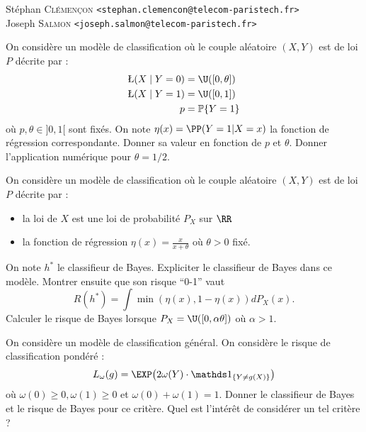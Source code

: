 \documentclass[a4paper,11pt]{article}
\begin{document}
\sloppy
{}

\medskip

\indent St\'ephan \textsc{Clémençon}  \texttt{<stephan.clemencon@telecom-paristech.fr>}
\\
\indent Joseph \textsc{Salmon} \texttt{<joseph.salmon@telecom-paristech.fr>}

\medskip



\exercice On considère un modèle de classification où le couple aléatoire $(X, Y)$ est de loi $P$ décrite par :
\begin{align*}
\L (X \mid Y= 0) & = \U ([0, \theta]) \\
\L (X \mid Y= 1) & = \U ([0, 1])\\
p & = \PROB\{Y=1\}
\end{align*}
où $p, \theta \in ]0, 1[$ sont fixés. On note $\eta(x)=\PP(Y=1|X=x)$ la fonction de régression correspondante. Donner sa valeur en fonction de $p$ et $\theta$. Donner l'application numérique pour $\theta = 1/2$.

\bigskip


\bigskip

\exercice  On considère un modèle de classification où le couple aléatoire $(X, Y)$ est de loi $P$ décrite par :
\begin{itemize}
\item la loi de $X$ est une loi de probabilité $P_X$ sur $\RR$
\item la fonction de régression $\displaystyle \eta(x) = \frac{x}{x+\theta}$ où $\theta>0$ fixé.
\end{itemize}
On note $h^*$ le classifieur de Bayes. Expliciter le classifieur de Bayes dans ce modèle. Montrer ensuite que son risque ``0-1'' vaut
\begin{equation*}
	R(h^*)=\int \min(\eta(x),1-\eta(x)) dP_X(x).
\end{equation*}
 Calculer le risque de Bayes lorsque $P_X = \U([0, \alpha\theta])$ où $\alpha>1$.

\bigskip


\bigskip

\exercice On considère un modèle de classification général. On considère le risque de classification pondéré :
\[
L_{\omega}(g) = \EXP \bigl(2\omega(Y) \cdot \ind_{\{Y \neq g(X)\}} \bigr)
\]
où $\omega(0)\geq 0, \omega(1)\geq 0$ et $\omega(0) + \omega(1) =1$.
Donner le classifieur de Bayes et le risque de Bayes pour ce critère.
Quel est l'intérêt de considérer un tel critère ?
\end{document}
